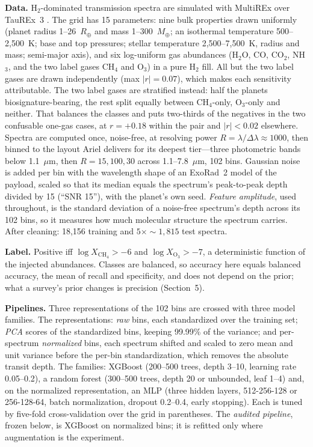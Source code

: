 \documentclass{article}
\begin{document}
\textbf{Data.} H$_2$-dominated transmission spectra are simulated with MultiREx \citep{duquecastano2025} over TauREx~3 \citep{alrefaie2021}. The grid has 15 parameters: nine bulk properties drawn uniformly (planet radius 1--26~$R_\oplus$ and mass 1--300~$M_\oplus$; an isothermal temperature 500--2,500~K; base and top pressures; stellar temperature 2,500--7,500~K, radius and mass; semi-major axis), and six log-uniform gas abundances (H$_2$O, CO, CO$_2$, NH$_3$, and the two label gases CH$_4$ and O$_3$) in a pure H$_2$ fill. All but the two label gases are drawn independently (max $|r| = 0.07$), which makes each sensitivity attributable. The two label gases are stratified instead: half the planets biosignature-bearing, the rest split equally between CH$_4$-only, O$_3$-only and neither. That balances the classes and puts two-thirds of the negatives in the two confusable one-gas cases, at $r = +0.18$ within the pair and $|r| < 0.02$ elsewhere. Spectra are computed once, noise-free, at resolving power $R = \lambda/\Delta\lambda \approx 1000$, then binned to the layout Ariel delivers for its deepest tier---three photometric bands below 1.1~$\mu$m, then $R = 15, 100, 30$ across 1.1--7.8~$\mu$m, 102 bins. Gaussian noise is added per bin with the wavelength shape of an ExoRad~2 \citep{mugnai2023} model of the payload, scaled so that its median equals the spectrum's peak-to-peak depth divided by 15 (``SNR 15''), with the planet's own seed. \emph{Feature amplitude}, used throughout, is the standard deviation of a noise-free spectrum's depth across its 102 bins, so it measures how much molecular structure the spectrum carries. After cleaning: 18,156 training and $5 \times {\sim}1{,}815$ test spectra.

\textbf{Label.} Positive iff $\log X_{\mathrm{CH_4}} > -6$ and $\log X_{\mathrm{O_3}} > -7$, a deterministic function of the injected abundances. Classes are balanced, so accuracy here equals balanced accuracy, the mean of recall and specificity, and does not depend on the prior; what a survey's prior changes is precision (Section~5).

\textbf{Pipelines.} Three representations of the 102 bins are crossed with three model families. The representations: \emph{raw} bins, each standardized over the training set; \emph{PCA} scores of the standardized bins, keeping 99.99\% of the variance; and per-spectrum \emph{normalized} bins, each spectrum shifted and scaled to zero mean and unit variance before the per-bin standardization, which removes the absolute transit depth. The families: XGBoost (200--500 trees, depth 3--10, learning rate 0.05--0.2), a random forest (300--500 trees, depth 20 or unbounded, leaf 1--4) and, on the normalized representation, an MLP (three hidden layers, 512-256-128 or 256-128-64, batch normalization, dropout 0.2--0.4, early stopping). Each is tuned by five-fold cross-validation over the grid in parentheses. The \emph{audited pipeline}, frozen below, is XGBoost on normalized bins; it is refitted only where augmentation is the experiment.
\end{document}
